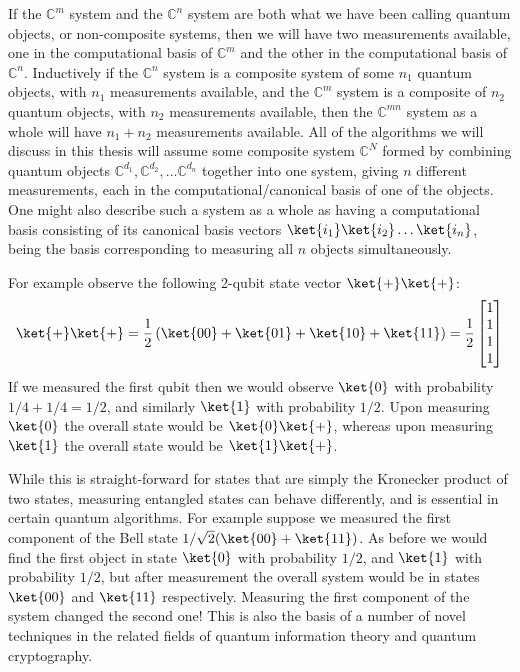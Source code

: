 If the $\mathbb{C}^m$ system and the $\mathbb{C}^n$ system are both what we have been calling quantum objects, or non-composite systems, then we will have two measurements available, one in the computational basis of $\mathbb{C}^m$ and the other in the computational basis of $\mathbb{C}^n$. Inductively if the $\mathbb{C}^n$ system is a composite system of some $n_1$ quantum objects, with $n_1$ measurements available, and the $\mathbb{C}^m$ system is a composite of $n_2$ quantum objects, with $n_2$ measurements available, then the $\mathbb{C}^{mn}$ system as a whole will have $n_1 + n_2$ measurements available. All of the algorithms we will discuss in this thesis will assume some composite system $\mathbb{C}^N$ formed by combining quantum objects $\mathbb{C}^{d_1}, \mathbb{C}^{d_2}, \dots \mathbb{C}^{d_n}$ together into one system, giving $n$ different measurements, each in the computational/canonical basis of one of the objects. One might also describe such a system as a whole as having a computational basis consisting of its canonical basis vectors $\ket{i_1}\ket{i_2}\dots\ket{i_n}$, being the basis corresponding to measuring all $n$ objects simultaneously.

For example observe the following 2-qubit state vector $\ket{+}\ket{+}$:
\[\ket{+}\ket{+}=\frac{1}{2}\left(\ket{00}+\ket{01}+\ket{10}+\ket{11}\right)=\frac{1}{2}\left[\begin{matrix}
1\\
1\\
1\\
1
\end{matrix}\right]\]
If we measured the first qubit then we would observe $\ket{0}$ with probability $1/4+1/4 = 1/2$, and similarly $\ket{1}$ with probability $1/2$. Upon measuring $\ket{0}$ the overall state would be $\ket{0}\ket{+}$, whereas upon measuring $\ket{1}$ the overall state would be $\ket{1}\ket{+}$.

While this is straight-forward for states that are simply the Kronecker product of two states, measuring entangled states can behave differently, and is essential in certain quantum algorithms. For example suppose we measured the first component of the Bell state $1/\sqrt{2}(\ket{00}+\ket{11})$. As before we would find the first object in state $\ket{0}$ with probability $1/2$, and $\ket{1}$ with probability $1/2$, but after measurement the overall system would be in states $\ket{00}$ and $\ket{11}$ respectively. Measuring the first component of the system changed the second one! This is also the basis of a number of novel techniques in the related fields of quantum information theory and quantum cryptography.

